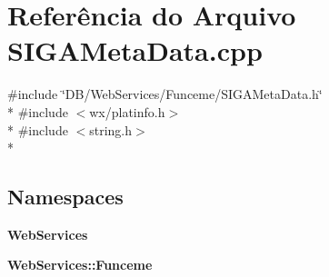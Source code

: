 \section{Referência do Arquivo S\+I\+G\+A\+Meta\+Data.\+cpp}
\label{_s_i_g_a_meta_data_8cpp}
{\ttfamily \#include \char`\"{}D\+B/\+Web\+Services/\+Funceme/\+S\+I\+G\+A\+Meta\+Data.\+h\char`\"{}}\\*
{\ttfamily \#include $<$wx/platinfo.\+h$>$}\\*
{\ttfamily \#include $<$string.\+h$>$}\\*
\subsection*{Namespaces}
\begin{DoxyCompactItemize}
\item 
 {\bf Web\+Services}
\item 
 {\bf Web\+Services\+::\+Funceme}
\end{DoxyCompactItemize}
